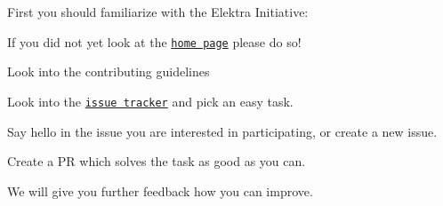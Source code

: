 First you should familiarize with the Elektra Initiative\+:


\begin{DoxyItemize}
\item If you did not yet look at the \href{https://www.libelektra.org/}{\tt home page} please do so!
\item Look into the contributing guidelines
\item Look into the \href{https://issues.libelektra.org/}{\tt issue tracker} and pick an easy task.
\item Say hello in the issue you are interested in participating, or create a new issue.
\item Create a PR which solves the task as good as you can.
\item We will give you further feedback how you can improve. 
\end{DoxyItemize}